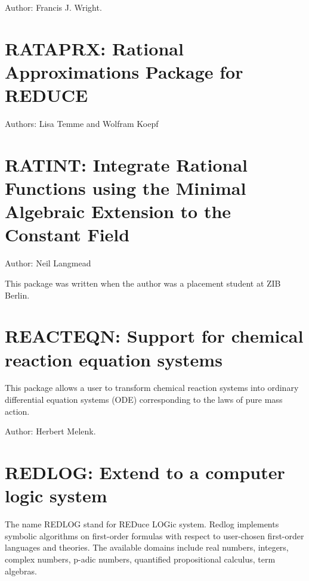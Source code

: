 Author: Francis J. Wright.



\newpage

\section{RATAPRX: Rational Approximations Package for REDUCE}

Authors: Lisa Temme and Wolfram Koepf



\newpage

\section{RATINT: Integrate Rational Functions using the Minimal Algebraic                                                                                                                           Extension to the Constant Field}

Author: Neil Langmead

This package was written when the author was a placement student at ZIB Berlin.



\newpage

\section{REACTEQN: Support for chemical reaction equation systems}


This package allows a user to transform chemical reaction systems into
ordinary differential equation systems (ODE) corresponding to the laws of
pure mass action.


Author: Herbert Melenk.



\newpage

\section{REDLOG: Extend \REDUCE{} to a computer logic system}


The name REDLOG stand for REDuce LOGic system. Redlog implements
symbolic algorithms on first-order formulas with respect to
user-chosen first-order languages and theories. The available domains
include real numbers, integers, complex numbers, p-adic numbers,
quantified propositional calculus, term algebras.

